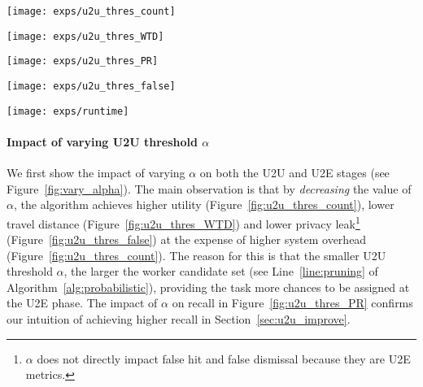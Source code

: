 \documentclass{USC-Thesis}
\numberwithin{equation}{chapter}
\begin{document}
\begin{figure*}[!ht]
	\begin{minipage}[b]{0.195\linewidth}
		\centering
		\texttt{[image: exps/u2u\_thres\_count]}
		\label{fig:u2u_thres_count}
	\end{minipage}
	\begin{minipage}[b]{0.195\linewidth}
		\centering
		\texttt{[image: exps/u2u\_thres\_WTD]}
		\label{fig:u2u_thres_WTD}
	\end{minipage}
	\begin{minipage}[b]{0.195\linewidth}
		\centering
		\texttt{[image: exps/u2u\_thres\_PR]}
		\label{fig:u2u_thres_PR}
	\end{minipage}
	\begin{minipage}[b]{0.195\linewidth}
		\centering
		\texttt{[image: exps/u2u\_thres\_false]}
		\label{fig:u2u_thres_false}
	\end{minipage}
	\begin{minipage}[b]{0.195\linewidth}
		\centering
		\texttt{[image: exps/runtime]}
		\label{fig:runtime}
	\end{minipage}
	\caption{Performance of \emph{Probabilistic-Model} by decreasing U2U threshold ($\alpha$).}
\label{fig:vary_alpha}
\end{figure*}

\paragraph{Impact of varying U2U threshold $\alpha$}
We first show the impact of varying $\alpha$ on both the U2U and U2E stages (see Figure~\ref{fig:vary_alpha}). The main observation is that by \emph{decreasing} the value of $\alpha$, the algorithm achieves higher utility (Figure~\ref{fig:u2u_thres_count}), lower travel distance (Figure~\ref{fig:u2u_thres_WTD}) and lower privacy leak\footnote{$\alpha$ does not directly impact false hit and false dismissal because they are U2E metrics.} (Figure~\ref{fig:u2u_thres_false}) at the expense of higher system overhead (Figure~\ref{fig:u2u_thres_count}). The reason for this is that the smaller U2U threshold $\alpha$, the larger the worker candidate set (see Line~\ref{line:pruning} of Algorithm~\ref{alg:probabilistic}), providing the task more chances to be assigned at the U2E phase. The impact of $\alpha$ on recall in Figure~\ref{fig:u2u_thres_PR} confirms our intuition of achieving higher recall in Section~\ref{sec:u2u_improve}.
\end{document}
